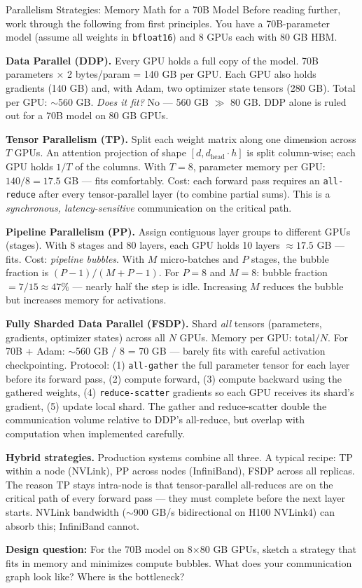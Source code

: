 \begin{thinkfirst}{Parallelism Strategies: Memory Math for a 70B Model}
Before reading further, work through the following from first principles.
You have a 70B-parameter model (assume all weights in \texttt{bfloat16}) and 8 GPUs each with 80 GB HBM.

\medskip
\textbf{Data Parallel (DDP).}
Every GPU holds a full copy of the model.
70B parameters $\times$ 2 bytes/param = 140 GB per GPU.
Each GPU also holds gradients (140 GB) and, with Adam, two optimizer state tensors (280 GB).
Total per GPU: $\sim$560 GB.
\emph{Does it fit?} No --- 560 GB $\gg$ 80 GB.
DDP alone is ruled out for a 70B model on 80 GB GPUs.

\medskip
\textbf{Tensor Parallelism (TP).}
Split each weight matrix along one dimension across $T$ GPUs.
An attention projection of shape $[d, d_{\text{head}} \cdot h]$ is split column-wise; each GPU holds
$1/T$ of the columns.
With $T = 8$, parameter memory per GPU: $140/8 = 17.5$ GB --- fits comfortably.
Cost: each forward pass requires an \texttt{all-reduce} after every tensor-parallel layer
(to combine partial sums).
This is a \emph{synchronous, latency-sensitive} communication on the critical path.

\medskip
\textbf{Pipeline Parallelism (PP).}
Assign contiguous layer groups to different GPUs (stages).
With 8 stages and 80 layers, each GPU holds 10 layers $\approx 17.5$ GB --- fits.
Cost: \emph{pipeline bubbles}.
With $M$ micro-batches and $P$ stages, the bubble fraction is $(P-1)/(M+P-1)$.
For $P=8$ and $M=8$: bubble fraction $= 7/15 \approx 47\%$ --- nearly half the step is idle.
Increasing $M$ reduces the bubble but increases memory for activations.

\medskip
\textbf{Fully Sharded Data Parallel (FSDP).}
Shard \emph{all} tensors (parameters, gradients, optimizer states) across all $N$ GPUs.
Memory per GPU: $\text{total} / N$.
For 70B + Adam: $\sim$560 GB / 8 = 70 GB --- barely fits with careful activation checkpointing.
Protocol: (1) \texttt{all-gather} the full parameter tensor for each layer before its forward pass,
(2) compute forward, (3) compute backward using the gathered weights,
(4) \texttt{reduce-scatter} gradients so each GPU receives its shard's gradient,
(5) update local shard.
The gather and reduce-scatter double the communication volume relative to DDP's all-reduce, but
overlap with computation when implemented carefully.

\medskip
\textbf{Hybrid strategies.}
Production systems combine all three.
A typical recipe: TP within a node (NVLink), PP across nodes (InfiniBand), FSDP across all replicas.
The reason TP stays intra-node is that tensor-parallel all-reduces are on the critical path of every
forward pass --- they must complete before the next layer starts.
NVLink bandwidth ($\sim$900 GB/s bidirectional on H100 NVLink4) can absorb this; InfiniBand cannot.

\medskip
\textbf{Design question:} For the 70B model on 8$\times$80 GB GPUs, sketch a strategy that fits in
memory and minimizes compute bubbles.
What does your communication graph look like?
Where is the bottleneck?
\end{thinkfirst}

